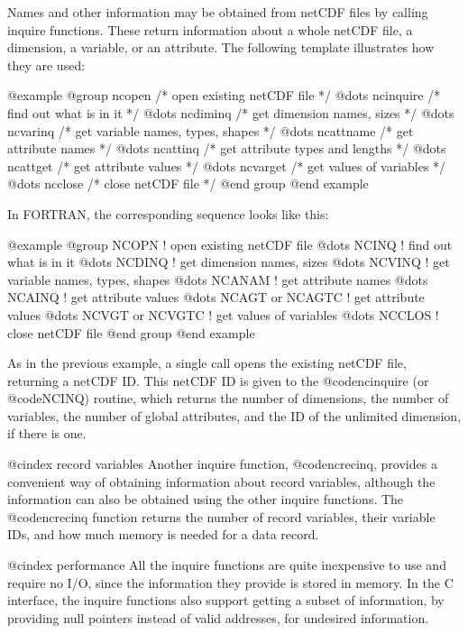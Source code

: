 Names and other information may be obtained from netCDF files by
calling inquire functions.
These return information about a whole netCDF
file, a dimension, a variable, or an attribute.  The following template
illustrates how they are used:

@example
@group
    ncopen           /* open existing netCDF file */
      @dots{}
    ncinquire        /* find out what is in it */
         @dots{}
       ncdiminq      /* get dimension names, sizes */
         @dots{}
       ncvarinq      /* get variable names, types, shapes */
            @dots{}
          ncattname  /* get attribute names */
            @dots{}
          ncattinq   /* get attribute types and lengths */
            @dots{}
          ncattget   /* get attribute values */
            @dots{}
       ncvarget      /* get values of variables */
         @dots{}
    ncclose          /* close netCDF file */
@end group
@end example

In FORTRAN, the corresponding sequence looks like this:

@example
@group
    NCOPN                 !  open existing netCDF file
      @dots{}
    NCINQ                 !  find out what is in it
         @dots{}
       NCDINQ             !  get dimension names, sizes
         @dots{}
       NCVINQ             !  get variable names, types, shapes
            @dots{}
          NCANAM          !  get attribute names
            @dots{}
          NCAINQ          !  get attribute values
            @dots{}
          NCAGT or NCAGTC !  get attribute values
            @dots{}
       NCVGT or NCVGTC    !  get values of variables
         @dots{}
    NCCLOS                !  close netCDF file
@end group
@end example

As in the previous example, a single call opens the existing netCDF
file, returning a netCDF ID.  This netCDF ID is given to the
@code{ncinquire} (or @code{NCINQ}) routine, which returns the number of
dimensions, the number of variables, the number of global attributes,
and the ID of the unlimited dimension, if there is one.

@cindex record variables
Another inquire function, @code{ncrecinq}, provides a convenient way of
obtaining information about record variables, although the information
can also be obtained using the other inquire functions.  The
@code{ncrecinq} function returns the number of record variables, their
variable IDs, and how much memory is needed for a data record.

@cindex performance
All the inquire functions are quite inexpensive to use and require no
I/O, since the information they provide is stored in memory.
In the C interface, the inquire functions
also support getting a subset of information, by providing null pointers
instead of valid addresses, for undesired information.

